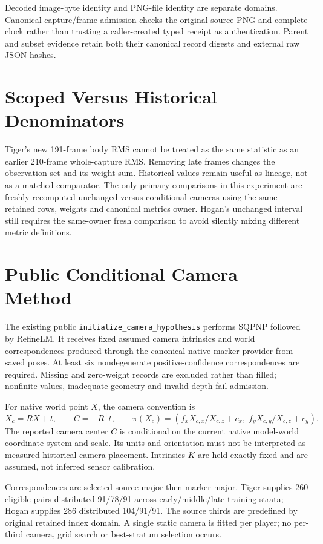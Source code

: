 \documentclass[11pt]{article}
\begin{document}
Decoded image-byte identity and PNG-file identity are separate domains. Canonical capture/frame admission checks the original source PNG and complete clock rather than trusting a caller-created typed receipt as authentication. Parent and subset evidence retain both their canonical record digests and external raw JSON hashes.
\section*{Scoped Versus Historical Denominators}
Tiger's new 191-frame body RMS cannot be treated as the same statistic as an earlier 210-frame whole-capture RMS. Removing late frames changes the observation set and its weight sum. Historical values remain useful as lineage, not as a matched comparator. The only primary comparisons in this experiment are freshly recomputed unchanged versus conditional cameras using the same retained rows, weights and canonical metrics owner. Hogan's unchanged interval still requires the same-owner fresh comparison to avoid silently mixing different metric definitions.
\newpage
\section*{Public Conditional Camera Method}
The existing public \texttt{initialize\_camera\_hypothesis} performs SQPNP followed by RefineLM. It receives fixed assumed camera intrinsics and world correspondences produced through the canonical native marker provider from saved poses. At least six nondegenerate positive-confidence correspondences are required. Missing and zero-weight records are excluded rather than filled; nonfinite values, inadequate geometry and invalid depth fail admission.

For native world point $X$, the camera convention is
\[
 X_c=RX+t,\qquad C=-R^{\mathsf T}t,\qquad
 \pi(X_c)=\left(f_xX_{c,x}/X_{c,z}+c_x,\;
 f_yX_{c,y}/X_{c,z}+c_y\right).
\]
The reported camera center $C$ is conditional on the current native model-world coordinate system and scale. Its units and orientation must not be interpreted as measured historical camera placement. Intrinsics $K$ are held exactly fixed and are assumed, not inferred sensor calibration.

Correspondences are selected source-major then marker-major. Tiger supplies 260 eligible pairs distributed 91/78/91 across early/middle/late training strata; Hogan supplies 286 distributed 104/91/91. The source thirds are predefined by original retained index domain. A single static camera is fitted per player; no per-third camera, grid search or best-stratum selection occurs.
\end{document}
